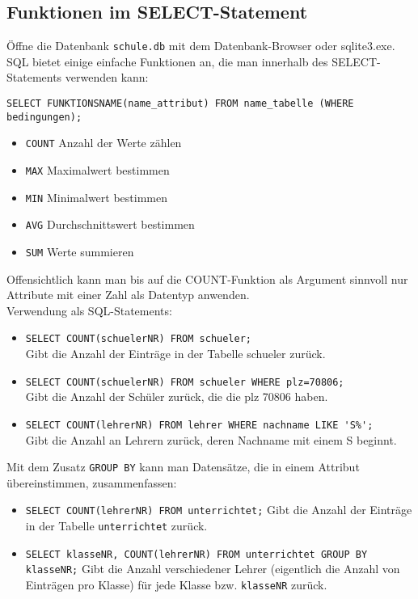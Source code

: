 \subsection[Funktionen]{Funktionen im SELECT-Statement}\label{funktionen}
Öffne die Datenbank \texttt{schule.db} mit dem Datenbank-Browser oder sqlite3.exe.\\
SQL bietet einige einfache Funktionen an, die man innerhalb des SELECT-Statements verwenden kann:
\begin{tcolorbox}[title=Funktionen in SQL]
	\lstinline!SELECT FUNKTIONSNAME(name_attribut) FROM name_tabelle (WHERE bedingungen);!
\end{tcolorbox}
\begin{itemize}
	\item \lstinline!COUNT!	Anzahl der Werte zählen
	\item \lstinline!MAX!	Maximalwert bestimmen
	\item \lstinline!MIN!	Minimalwert bestimmen
	\item \lstinline!AVG!	Durchschnittswert bestimmen
	\item \lstinline!SUM!	Werte summieren
\end{itemize}

Offensichtlich kann man bis auf die COUNT-Funktion als Argument sinnvoll nur Attribute mit einer Zahl als Datentyp anwenden.\\
Verwendung als SQL-Statements:
\begin{itemize}
	\item \lstinline!SELECT COUNT(schuelerNR) FROM schueler;!\\
	Gibt die Anzahl der Einträge in der Tabelle schueler zurück.
	\item \lstinline!SELECT COUNT(schuelerNR) FROM schueler WHERE plz=70806;!\\
	Gibt die Anzahl der Schüler zurück, die die plz 70806 haben.
	\item \lstinline!SELECT COUNT(lehrerNR) FROM lehrer WHERE nachname LIKE 'S%';!\\
	Gibt die Anzahl an Lehrern zurück, deren Nachname mit einem S beginnt.
\end{itemize}
Mit dem Zusatz \lstinline!GROUP BY! kann man Datensätze, die in einem Attribut übereinstimmen, zusammenfassen:
\begin{itemize}
	\item \lstinline!SELECT COUNT(lehrerNR) FROM unterrichtet;!
	Gibt die Anzahl der Einträge in der Tabelle \lstinline!unterrichtet! zurück.
	\item \lstinline!SELECT klasseNR, COUNT(lehrerNR) FROM unterrichtet GROUP BY klasseNR;!
	Gibt die Anzahl verschiedener Lehrer (eigentlich die Anzahl von Einträgen pro Klasse) für jede Klasse bzw. \lstinline!klasseNR! zurück.
\end{itemize}

